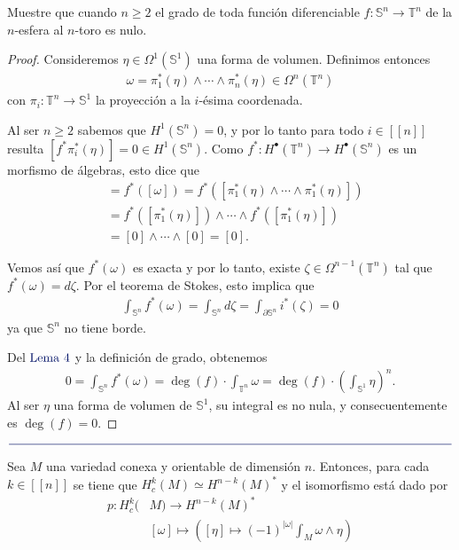 \documentclass[11pt]{article}
\newcommand{\Ss}{\mathbb{S}}
\newcommand{\T}{\mathbb{T}}
\newcommand{\nat}[1]{[\![#1]\!]}
\newcommand{\paint}[1]{\color{color}{#1}}
\newcommand{\tpaing}[1]{\paint{\text{#1}}}
\newcommand{\paintline}{\begin{center}
$\paint{
\rule{400pt}{0.5pt}
}$
\vspace{10pt}
\end{center}}
\newenvironment{theorem}[2][Teorema]{\begin{trivlist}
\item[\hskip \labelsep \paint{{\bfseries #1}}\hskip \labelsep {\bfseries #2.}]}{\end{trivlist}}
\newenvironment{exercise}[2][Ejercicio]{\begin{trivlist}
\item[\hskip \labelsep \paint{{\bfseries #1}}\hskip \labelsep {\bfseries #2.}]}{\end{trivlist}}
\begin{document}
\begin{exercise}{3} Muestre que cuando $n \geq 2$ el grado de toda función diferenciable $f : \Ss^n \to \T^n$ de la $n$-esfera al $n$-toro es nulo.
\end{exercise}
\begin{proof} Consideremos $\eta \in \Omega^1(\Ss^1)$ una forma de volumen. Definimos entonces
\begin{align*}
\omega = \pi^\ast_1(\eta) \wedge \cdots \wedge \pi^\ast_n(\eta) \in \Omega^n(\T^n)
\end{align*}
con $\pi_i : \T^n \to \Ss^1$ la proyección a la $i$-ésima coordenada. 

Al ser $n \geq 2$ sabemos que $H^1(\Ss^n) = 0$, y por lo tanto para todo $i \in \nat{n}$ resulta $[f^*\pi_i^*(\eta)] = 0 \in H^1(\Ss^n)$. Como $f^* : H^\bullet(\T^n) \to H^\bullet(\Ss^n)$ es un morfismo de álgebras, esto dice que
\begin{align*}
[f^*(\omega)] &= f^*([\omega]) = f^*([\pi^\ast_1(\eta) \wedge \cdots \wedge \pi^\ast_1(\eta)])\\
&= f^*([\pi^\ast_1(\eta)]) \wedge \cdots \wedge f^*([\pi^\ast_1(\eta)])\\
&= [0] \wedge \cdots \wedge [0] = [0].
\end{align*}

Vemos así que $f^*(\omega)$ es exacta y por lo tanto, existe $\zeta \in \Omega^{n-1}(\T^n)$ tal que $f^*(\omega) = d\zeta$. Por el teorema de Stokes, esto implica que
\begin{align*}
\int_{\Ss^n}f^*(\omega) = \int_{\Ss^n}d\zeta = \int_{\partial \Ss^n}i^*(\zeta) = 0
\end{align*}
ya que $\Ss^n$ no tiene borde.

Del $\tpaing{Lema $4$}$ y la definición de grado, obtenemos
\begin{align*}
0 = \int_{\Ss^n}f^*(\omega) = \deg(f) \cdot \int_{\T^n}\omega = \deg(f) \cdot \left(\int_{\Ss^1} \eta\right)^n.
\end{align*}
Al ser $\eta$ una forma de volumen de $\Ss^1$, su integral es no nula, y consecuentemente es $\deg(f) = 0$. 
\end{proof}

\paintline

\begin{theorem}{5 (dualidad de Poincaré)} Sea $M$ una variedad conexa y orientable de dimensión $n$. Entonces, para cada $k \in \nat{n}$ se tiene que $H_c^k(M) \simeq H^{n-k}(M)^*$ y el isomorfismo está dado por
\begin{align*}
p : H_c^k(&M) \longrightarrow H^{n-k}(M)^*\\
&[\omega] \mapsto \left([\eta] \mapsto (-1)^{|\omega|}\int_M \omega \wedge \eta\right)
\end{align*}
\end{theorem}
\end{document}
